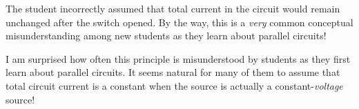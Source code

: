 The student incorrectly assumed that total current in the circuit would remain unchanged after the switch opened.  By the way, this is a {\it very} common conceptual misunderstanding among new students as they learn about parallel circuits!







I am surprised how often this principle is misunderstood by students as they first learn about parallel circuits.  It seems natural for many of them to assume that total circuit current is a constant when the source is actually a constant-{\it voltage} source!




